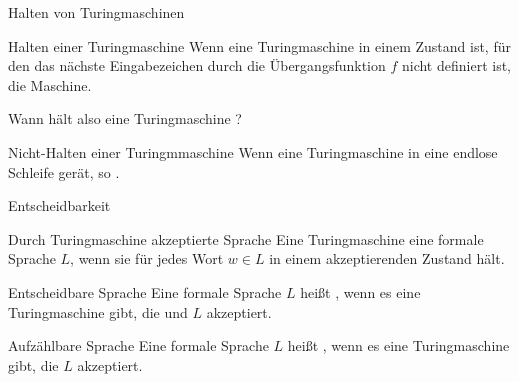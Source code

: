 \begin{frame}{Halten von Turingmaschinen}
	
	\p
	
	\begin{block}{Halten einer Turingmaschine}
		Wenn eine Turingmaschine in einem Zustand ist, für den das nächste Eingabezeichen durch die Übergangsfunktion $f$ nicht definiert ist,  die Maschine.
	\end{block}

	\bp

	Wann hält also eine Turingmaschine ?
	
	\bp
	
	\begin{block}{Nicht-Halten einer Turingmmaschine}
		Wenn eine Turingmaschine in eine endlose Schleife gerät, so .
	\end{block}
\end{frame}

\begin{frame}{Entscheidbarkeit}
	\ip
	
	\begin{block}{Durch Turingmaschine akzeptierte Sprache}
		Eine Turingmaschine  eine formale Sprache $L$, wenn sie für jedes Wort $w \in L$ in einem akzeptierenden Zustand hält.
	\end{block}

	\bp

	\begin{block}{Entscheidbare Sprache}
		Eine formale Sprache $L$ heißt , wenn es eine Turingmaschine gibt, die  und $L$ akzeptiert.
	\end{block}

	\bp

	\begin{block}{Aufzählbare Sprache}
		Eine formale Sprache $L$ heißt , wenn es eine Turingmaschine gibt, die $L$ akzeptiert.
	\end{block}
\end{frame}

